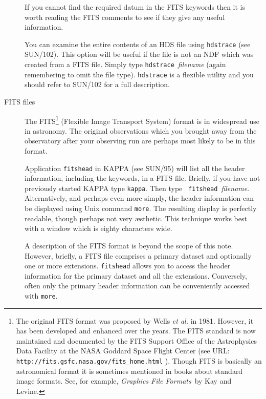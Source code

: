\documentclass[twoside,11pt]{article}
\newcommand{\htmladdnormallink}[2]{#1}
\newcommand{\xref}[3]{#1}
\begin{document}
\begin{description}
   If you cannot find the required datum in the FITS keywords then it
   is worth reading the FITS comments to see if they give any useful
   information.

   You can examine the entire contents of an HDS file using {\tt hdstrace}
   (see \xref{SUN/102}{sun102}{}\cite{SUN102}).  This option will be
   useful if the file is not an NDF which was created from a
   FITS file.  Simply type
   \xref{{\tt hdstrace}}{sun102}{HDSTRACE}~{\it filename} (again
   remembering to omit the file type).  {\tt hdstrace} is a flexible
   utility and you should refer to SUN/102 for a full description.

  \item[FITS files] The FITS\footnote{The original FITS format was
   proposed by Wells {\it et al.}\/\cite{WELLS81} in 1981.  However, it
   has been developed and enhanced over the years.  The FITS
   standard is now maintained and documented by the FITS Support Office
   of the Astrophysics Data Facility at the NASA Goddard Space Flight
   Center (see URL: \htmladdnormallink{ {\tt
   http://fits.gsfc.nasa.gov/fits\_home.html} }
   {http://fits.gsfc.nasa.gov/fits_home.html}).
   Though FITS is basically an astronomical format it is sometimes
   mentioned in books about standard image formats.  See, for example,
   {\it Graphics File Formats}\, by Kay and Levine\cite{KAY95}.} (Flexible
   Image Transport System) format is in widespread use in astronomy.  The
   original observations which you brought away from the observatory after
   your observing run are perhaps most likely to be in this format.

   Application \xref{{\tt fitshead}}{sun95}{FITSHEAD} in KAPPA (see
   \xref{SUN/95}{sun95}{}\cite{SUN95}) will list all the header
   information, including the keywords, in a FITS file.  Briefly, if you
   have not previously started KAPPA type {\tt kappa}.  Then type {\tt
   fitshead}~{\it filename}.  Alternatively, and perhaps even more
   simply, the header information can be displayed using Unix command
   {\tt more}.  The resulting display is perfectly readable, though
   perhaps not very \ae sthetic.  This technique works best with a
   window which is eighty characters wide.

   A description of the FITS format is beyond the scope of this note.
   However, briefly, a FITS file comprises a primary dataset and
   optionally one or more extensions.  {\tt fitshead} allows you to access
   the header information for the primary dataset and all the
   extensions.  Conversely, often only the primary header information
   can be conveniently accessed with {\tt more}.


\end{description}
\end{document}
